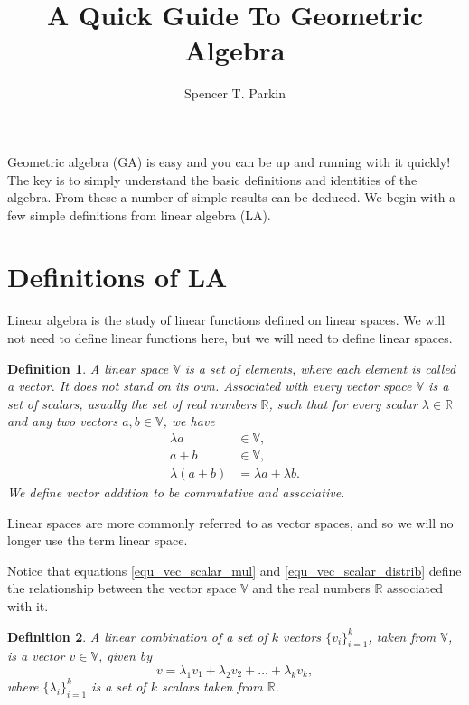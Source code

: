 \documentclass[12pt]{article}
\title{A Quick Guide To Geometric Algebra}
\author{Spencer T. Parkin}
\numberwithin{equation}{section}
\newcommand{\V}{\mathbb{V}}
\newcommand{\R}{\mathbb{R}}
\newtheorem{definition}{Definition}[section]
\begin{document}
\maketitle

Geometric algebra (GA) is easy and you can be up and running with it quickly!  The key is to
simply understand the basic definitions and identities of the algebra.  From these a number
of simple results can be deduced.  We begin with a few simple definitions from linear algebra (LA).

\section{Definitions of LA}

Linear algebra is the study of linear functions defined on linear spaces.  We will not need
to define linear functions here, but we will need to define linear spaces.
\begin{definition}\label{def_vec_space}
A linear space $\V$ is a set of elements, where each element is called a vector.  It does not stand on its own.
Associated with every vector space $\V$ is a set of scalars, usually the set of real numbers $\R$,
such that for every scalar $\lambda\in\R$ and any two vectors $a,b\in\V$, we have
\begin{align}
\lambda a &\in \V\label{equ_vec_scalar_mul}, \\
a+b &\in\V\label{equ_vec_addition}, \\
\lambda(a+b) &= \lambda a+\lambda b.\label{equ_vec_scalar_distrib}
\end{align}
We define vector addition to be commutative and associative.
\end{definition}
Linear spaces are more commonly referred to as vector spaces, and so we will no longer
use the term linear space.

Notice that equations \eqref{equ_vec_scalar_mul} and \eqref{equ_vec_scalar_distrib}
define the relationship between the
vector space $\V$ and the real numbers $\R$ associated with it.

\begin{definition}
A linear combination of a set of $k$ vectors $\{v_i\}_{i=1}^k$, taken from $\V$, is
a vector $v\in\V$, given by
\begin{equation}
v = \lambda_1 v_1 + \lambda_2 v_2 + \dots + \lambda_k v_k,
\end{equation}
where $\{\lambda_i\}_{i=1}^k$ is a set of $k$ scalars taken from $\R$.
\end{definition}
\end{document}
